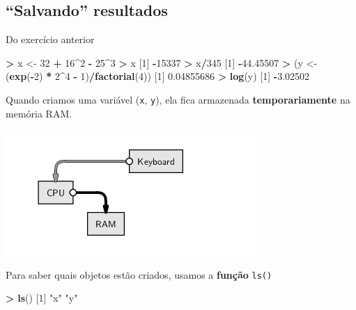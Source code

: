 \documentclass[10pt,a4paper]{book}
\newenvironment{Shaded}{\begin{snugshade}}{\end{snugshade}}
\newcommand{\KeywordTok}[1]{\textcolor[rgb]{0.13,0.29,0.53}{\textbf{#1}}}
\newcommand{\DecValTok}[1]{\textcolor[rgb]{0.00,0.00,0.81}{#1}}
\newcommand{\FloatTok}[1]{\textcolor[rgb]{0.00,0.00,0.81}{#1}}
\newcommand{\StringTok}[1]{\textcolor[rgb]{0.31,0.60,0.02}{#1}}
\newcommand{\OperatorTok}[1]{\textcolor[rgb]{0.81,0.36,0.00}{\textbf{#1}}}
\newcommand{\NormalTok}[1]{#1}
\begin{document}
\subsection{\texorpdfstring{``Salvando''
resultados}{Salvando resultados}}\label{salvando-resultados}

Do exercício anterior

\begin{Shaded}
\begin{Highlighting}[]
\OperatorTok{>}\StringTok{ }\NormalTok{x <-}\StringTok{ }\DecValTok{32} \OperatorTok{+}\StringTok{ }\DecValTok{16}\OperatorTok{^}\DecValTok{2} \OperatorTok{-}\StringTok{ }\DecValTok{25}\OperatorTok{^}\DecValTok{3}
\OperatorTok{>}\StringTok{ }\NormalTok{x}
\NormalTok{[}\DecValTok{1}\NormalTok{] }\OperatorTok{-}\DecValTok{15337}
\OperatorTok{>}\StringTok{ }\NormalTok{x}\OperatorTok{/}\DecValTok{345}
\NormalTok{[}\DecValTok{1}\NormalTok{] }\OperatorTok{-}\FloatTok{44.45507}
\OperatorTok{>}\StringTok{ }\NormalTok{(y <-}\StringTok{ }\NormalTok{(}\KeywordTok{exp}\NormalTok{(}\OperatorTok{-}\DecValTok{2}\NormalTok{) }\OperatorTok{*}\StringTok{ }\DecValTok{2}\OperatorTok{^}\DecValTok{4} \OperatorTok{-}\StringTok{ }\DecValTok{1}\NormalTok{)}\OperatorTok{/}\KeywordTok{factorial}\NormalTok{(}\DecValTok{4}\NormalTok{))}
\NormalTok{[}\DecValTok{1}\NormalTok{] }\FloatTok{0.04855686}
\OperatorTok{>}\StringTok{ }\KeywordTok{log}\NormalTok{(y)}
\NormalTok{[}\DecValTok{1}\NormalTok{] }\OperatorTok{-}\FloatTok{3.02502}
\end{Highlighting}
\end{Shaded}

Quando criamos uma variável (\texttt{x}, \texttt{y}), ela fica
armazenada \textbf{temporariamente} na memória RAM.

\begin{center}\includegraphics[width=0.5\linewidth]{img/script-assign} \end{center}

Para saber quais objetos estão criados, usamos a \textbf{função}
\texttt{ls()}

\begin{Shaded}
\begin{Highlighting}[]
\OperatorTok{>}\StringTok{ }\KeywordTok{ls}\NormalTok{()}
\NormalTok{[}\DecValTok{1}\NormalTok{] }\StringTok{"x"} \StringTok{"y"}
\end{Highlighting}
\end{Shaded}
\end{document}
